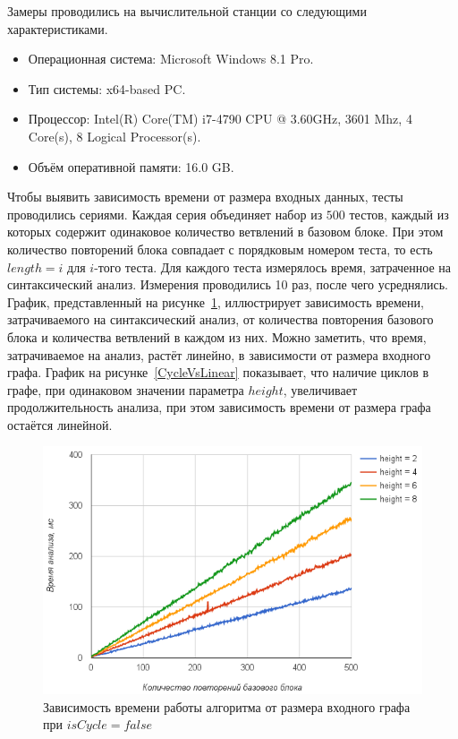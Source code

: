 Замеры проводились на вычислительной станции со следующими характеристиками.
\begin{itemize}
\item Операционная система: Microsoft Windows 8.1 Pro.
\item Тип системы: x64-based PC.
\item Процессор: Intel(R) Core(TM) i7-4790 CPU @ 3.60GHz, 3601 Mhz, 4 Core(s), 8 Logical Processor(s).
\item Объём оперативной памяти: 16.0 GB.
\end{itemize}

Чтобы выявить зависимость времени от размера входных данных, тесты проводились сериями. Каждая серия объединяет набор из $500$ тестов, каждый из которых содержит одинаковое количество ветвлений в базовом блоке. При этом количество повторений блока совпадает с порядковым номером теста, то есть $length=i$ для $i$-того теста. Для каждого теста измерялось время, затраченное на синтаксический анализ. Измерения проводились 10 раз, после чего усреднялись. График, представленный на рисунке~\ref{diffheights}, иллюстрирует зависимость времени, затрачиваемого на синтаксический анализ, от количества повторения базового блока и количества ветвлений в каждом из них. Можно заметить, что время, затрачиваемое на анализ, растёт линейно, в зависимости от размера входного графа. График на рисунке~\ref{CycleVsLinear} показывает, что наличие циклов в графе, при одинаковом значении параметра $height$, увеличивает продолжительность анализа, при этом зависимость времени от размера графа остаётся линейной.

\begin{figure}[h!]
 \centering
 \includegraphics[width=15cm]{pics/diffheights.png}
 \caption{Зависимость времени работы алгоритма от размера входного графа при $isCycle=false$}
 \label{diffheights}
\end{figure}


